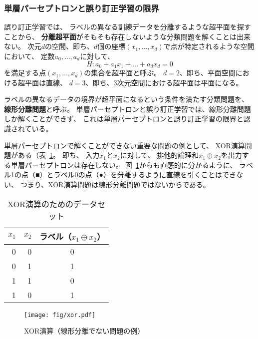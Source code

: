 \subsubsection{単層パーセプトロンと誤り訂正学習の限界}
\label{sec:limit-error-correction}

誤り訂正学習では、
ラベルの異なる訓練データを分離するような超平面を探すことから、
\textbf{分離超平面}がそもそも存在しないような分類問題を解くことは出来ない。
次元$d$の空間、即ち、$d$個の座標$(x_1, \dots, x_d)$で点が特定されるような空間において、
定数$a_0, \dots, a_d$に対して、
\[
  H: a_0 + a_1 x_1 + \dots + a_d x_d = 0
\]
を満足する点$(x_1, \dots, x_d)$の集合を超平面と呼ぶ。
$d = 2$、即ち、平面空間における超平面は直線、
$d = 3$、即ち、3次元空間における超平面は平面になる。

ラベルの異なるデータの境界が超平面になるという条件を満たす分類問題を、
\textbf{線形分離問題}と呼ぶ。
単層パーセプトロンと誤り訂正学習では、線形分離問題しか解くことができず、
これは単層パーセプトロンと誤り訂正学習の限界と認識されている。

単層パーセプトロンで解くことができない重要な問題の例として、
XOR演算問題がある（表~\ref{tab:xor}。
即ち、
入力$x_1$と$x_2$に対して、
排他的論理和$x_1\oplus x_2$を出力する単層パーセプトロンは存在しない。
図~\ref{fig:xor}からも直感的に分かるように、
ラベル1の点（■）とラベル0の点（●）を分離するように直線を引くことはできない、
つまり、XOR演算問題は線形分離問題ではないからである。


\begin{table}
  \centering
  \caption{XOR演算のためのデータセット}
  \label{tab:xor}
  \begin{tabular}{rrc}
    \toprule
    $x_1$ & $x_2$ & ラベル（$x_1\oplus x_2$）\\
    \midrule
    0 & 0 & 0\\
    0 & 1 & 1\\
    1 & 1 & 0\\
    1 & 0 & 1\\
    \bottomrule       
  \end{tabular}
\end{table}

\begin{figure}
  \centering
  \texttt{[image: fig/xor.pdf]}
  \caption{XOR演算（線形分離でない問題の例）}
  \label{fig:xor}
\end{figure}

